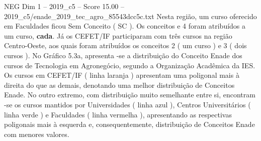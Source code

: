 \begin{textsample}{NEG Dim 1 – 2019\_c5 – Score 15.00 – 2019\_c5/enade\_2019\_tec\_agro\_85543dcc5c.txt}
Nesta região, um curso oferecido em Faculdades ficou Sem Conceito ( SC ).
Os conceitos e 4 foram atribuídos a um curso, \textbf{cada}.
Já os CEFET/IF participaram com três cursos na região Centro-Oeste, aos quais foram atribuídos os conceitos 2 ( um curso ) e 3 ( dois cursos ).
No Gráfico 5.3a, apresenta -se a distribuição do Conceito Enade dos cursos de Tecnologia em Agronegócio, segundo a Organização Acadêmica da IES.
Os cursos em CEFET/IF ( linha laranja ) apresentam uma poligonal mais à direita do que as demais, denotando uma melhor distribuição de Conceitos Enade.
No outro extremo, com distribuição muito semelhante entre si, encontram -se os cursos mantidos por Universidades ( linha azul ), Centros Universitários ( linha verde ) e Faculdades ( linha vermelha ), apresentando as respectivas poligonais mais à esquerda e, consequentemente, distribuição de Conceitos Enade com menores valores.

\end{textsample}
